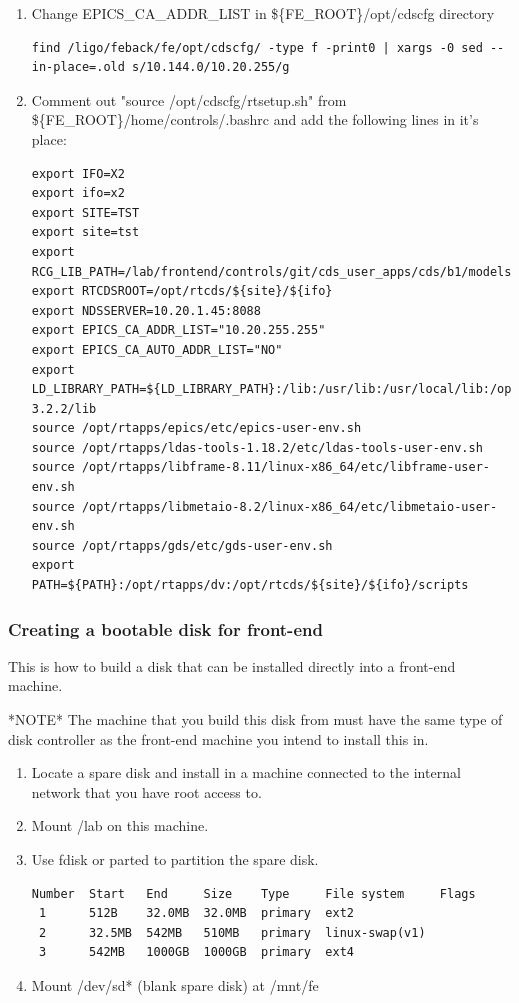 \begin{enumerate}
\begin{lstlisting}
echo -e "10.20.1.15:/sugwg/projects/lab     /lab            nfs     sync,hard,intr,rw,nolock,rsize=8192,wsize=8192    0 0\n" >> ${FE_ROOT}/etc/fstab
\end{lstlisting}
    \item Change EPICS\_CA\_ADDR\_LIST in \$\{FE\_ROOT\}/opt/cdscfg directory
\begin{lstlisting}
find /ligo/feback/fe/opt/cdscfg/ -type f -print0 | xargs -0 sed --in-place=.old s/10.144.0/10.20.255/g
\end{lstlisting}
    \item Comment out "source /opt/cdscfg/rtsetup.sh" from \$\{FE\_ROOT\}/home/controls/.bashrc and add the following lines in it's place:
\begin{lstlisting}
export IFO=X2
export ifo=x2
export SITE=TST
export site=tst
export RCG_LIB_PATH=/lab/frontend/controls/git/cds_user_apps/cds/b1/models
export RTCDSROOT=/opt/rtcds/${site}/${ifo}
export NDSSERVER=10.20.1.45:8088
export EPICS_CA_ADDR_LIST="10.20.255.255"
export EPICS_CA_AUTO_ADDR_LIST="NO"
export LD_LIBRARY_PATH=${LD_LIBRARY_PATH}:/lib:/usr/lib:/usr/local/lib:/opt/rtapps/fftw-3.2.2/lib
source /opt/rtapps/epics/etc/epics-user-env.sh
source /opt/rtapps/ldas-tools-1.18.2/etc/ldas-tools-user-env.sh
source /opt/rtapps/libframe-8.11/linux-x86_64/etc/libframe-user-env.sh
source /opt/rtapps/libmetaio-8.2/linux-x86_64/etc/libmetaio-user-env.sh
source /opt/rtapps/gds/etc/gds-user-env.sh
export PATH=${PATH}:/opt/rtapps/dv:/opt/rtcds/${site}/${ifo}/scripts
\end{lstlisting}
\end{enumerate}
\subsubsection{Creating a bootable disk for front-end}

This is how to build a disk that can be installed directly into a front-end machine.

*NOTE* The machine that you build this disk from must have the same type of disk controller as the front-end machine you intend to install this in.

\begin{enumerate}
    \item Locate a spare disk and install in a machine connected to the internal network that you have root access to.
    \item Mount /lab on this machine.
    \item Use fdisk or parted to partition the spare disk.
\begin{lstlisting}
Number  Start   End     Size    Type     File system     Flags
 1      512B    32.0MB  32.0MB  primary  ext2
 2      32.5MB  542MB   510MB   primary  linux-swap(v1)
 3      542MB   1000GB  1000GB  primary  ext4
\end{lstlisting}
    \item Mount /dev/sd* (blank spare disk) at /mnt/fe
\end{enumerate}